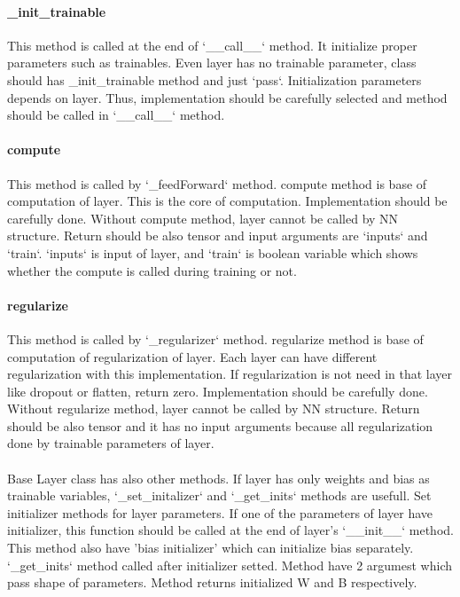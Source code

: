 \documentclass[12pt]{report}
\begin{document}
\paragraph{\_init\_trainable}
This method is called at the end of `\_\_call\_\_` method. It initialize proper parameters such as trainables. Even layer has no trainable parameter, class should has \_init\_trainable
method and just `pass`. Initialization parameters depends on layer. Thus, implementation should be carefully selected and method should be called in `\_\_call\_\_` method.

\paragraph{compute}
This method is called by `\_feedForward` method. compute method is base of computation of layer. This is the core of 
computation. Implementation should be carefully done. Without compute method, layer cannot be called by NN structure. Return should be also tensor and input arguments are `inputs` and `train`. `inputs` is input of layer, and `train` is boolean variable which shows whether the compute is called during training or not. 

\paragraph{regularize}
This method is called by `\_regularizer` method. regularize method is base of computation of regularization of layer. Each layer can have different regularization with this implementation. 
If regularization is not need in that layer like dropout or flatten, return zero. Implementation should be carefully done. 
Without regularize method, layer cannot be called by NN structure. Return should be also tensor and it has no input arguments because all regularization done by trainable parameters of layer.

\paragraph{}
Base Layer class has also other methods. If layer has only weights and bias as trainable variables, `\_set\_initalizer` and `\_get\_inits` methods are usefull. Set initializer methods for layer parameters. If one of the parameters of layer have initializer, this function should be called at the end of layer's `\_\_init\_\_` method. This method also have 'bias initializer' which can initialize bias separately. `\_get\_inits` method called after initializer setted. Method have 2 argumest which pass shape of parameters. Method returns initialized W and B respectively.
\end{document}
